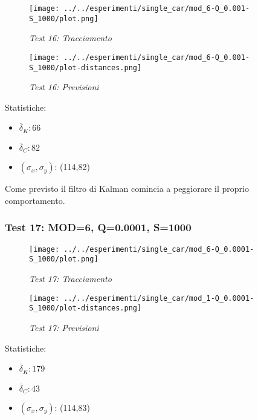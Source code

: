 \begin{figure}[hb]
\centering
\texttt{[image: ../../esperimenti/single\_car/mod\_6-Q\_0.001-S\_1000/plot.png]}
\caption{\textit{Test 16: Tracciamento}}
\end{figure}

\begin{figure}[hb]
\centering
\texttt{[image: ../../esperimenti/single\_car/mod\_6-Q\_0.001-S\_1000/plot-distances.png]}
\caption{\textit{Test 16: Previsioni}}
\end{figure}

Statistiche:
\begin{itemize}
\item \begin{math} \bar \delta_K: 66 \end{math}
\item \begin{math} \bar \delta_C: 82 \end{math}
\item \begin{math}(\sigma_x,\sigma_y)\end{math}: (114,82)
\end{itemize}

Come previsto il filtro di Kalman comincia a peggiorare il proprio comportamento. 

\newpage
\subsubsection{Test 17: MOD=6, Q=0.0001, S=1000}

\begin{figure}[hb]
\centering
\texttt{[image: ../../esperimenti/single\_car/mod\_6-Q\_0.0001-S\_1000/plot.png]}
\caption{\textit{Test 17: Tracciamento}}
\end{figure}

\begin{figure}[hb]
\centering
\texttt{[image: ../../esperimenti/single\_car/mod\_1-Q\_0.0001-S\_1000/plot-distances.png]}
\caption{\textit{Test 17: Previsioni}}
\end{figure}

Statistiche:
\begin{itemize}
\item \begin{math} \bar \delta_K: 179 \end{math}
\item \begin{math} \bar \delta_C: 43 \end{math}
\item \begin{math}(\sigma_x,\sigma_y)\end{math}: (114,83)
\end{itemize}


